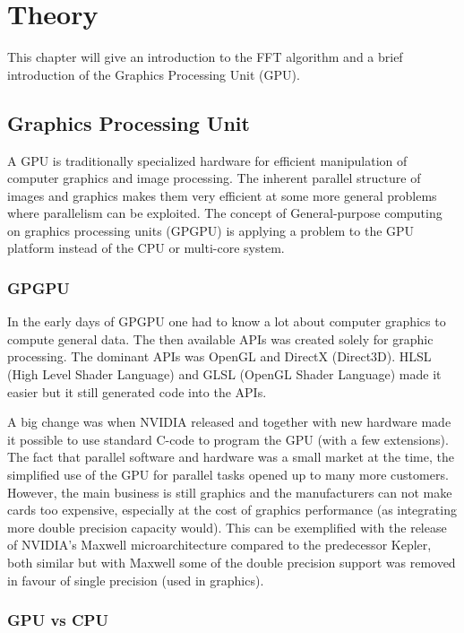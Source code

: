 \chapter{Theory}

This chapter will give an introduction to the FFT algorithm and a brief introduction of the Graphics Processing Unit (GPU).

\section{Graphics Processing Unit}

A GPU is traditionally specialized hardware for efficient manipulation of computer graphics and image processing. The inherent parallel structure of images and graphics makes them very efficient at some more general problems where parallelism can be exploited. The concept of General-purpose computing on graphics processing units (GPGPU) is applying a problem to the GPU platform instead of the CPU or multi-core system.

\subsection{GPGPU}

In the early days of GPGPU one had to know a lot about computer graphics to compute general data. The then available APIs was created solely for graphic processing. The dominant APIs was OpenGL and DirectX (Direct3D). HLSL (High Level Shader Language) and GLSL (OpenGL Shader Language) made it easier but it still generated code into the APIs.

A big change was when NVIDIA released \CU and together with new hardware made it possible to use standard C-code to program the GPU (with a few extensions). The fact that parallel software and hardware was a small market at the time, the simplified use of the GPU for parallel tasks opened up to many more customers. However, the main business is still graphics and the manufacturers can not make cards too expensive, especially at the cost of graphics performance (as integrating more double precision capacity would). This can be exemplified with the release of NVIDIA's Maxwell microarchitecture compared to the predecessor Kepler, both similar but with Maxwell some of the double precision support was removed in favour of single precision (used in graphics).

\subsection{GPU vs CPU}

